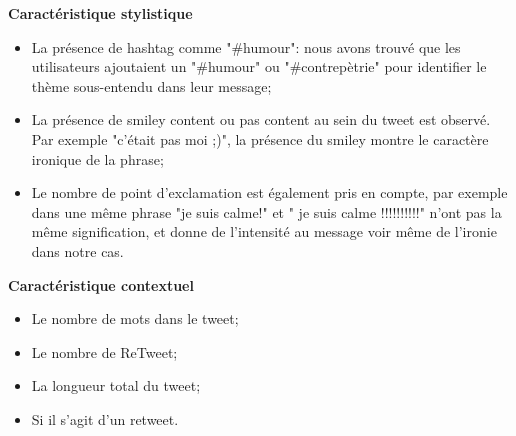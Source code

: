 \documentclass[10pt,a4paper,twoside]{article}
\begin{document}
\textbf{Caractéristique stylistique}
\begin{itemize}
\item La présence de hashtag comme "\#humour": nous avons trouvé que les utilisateurs ajoutaient un "\#humour" ou "\#contrepètrie" pour identifier le thème sous-entendu dans leur message;
\item La présence de smiley content ou pas content au sein du tweet est observé. Par exemple "c'était pas moi ;)", la présence du smiley montre le caractère ironique de la phrase;
\item Le nombre de point d'exclamation est également pris en compte, par exemple dans une même phrase "je suis calme!" et " je suis calme !!!!!!!!!!" n'ont pas la même signification, et donne de l'intensité au message voir même de l'ironie dans notre cas. 
\end{itemize}
\vspace{0.5cm}

\textbf{Caractéristique contextuel}
\begin{itemize}
\item Le nombre de mots dans le tweet;
\item Le nombre de ReTweet;
\item La longueur total du tweet;
\item Si il s'agit d'un retweet.
\end{itemize}
\vspace{0.5cm}
\end{document}
